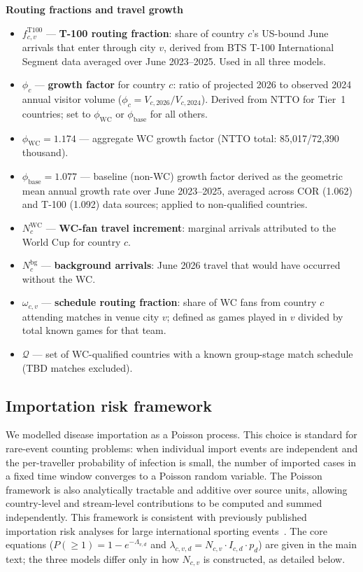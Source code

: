 \documentclass[12pt]{article}
\begin{document}
\vspace{0.5em}
\noindent\textbf{Routing fractions and travel growth}
\begin{itemize}
  \item $f_{c,v}^{\text{T100}}$ --- \textbf{T-100 routing fraction}:
    share of country $c$'s US-bound June arrivals that enter through
    city $v$, derived from BTS T-100 International Segment data
    averaged over June 2023--2025. Used in all three models.
  \item $\phi_c$ --- \textbf{growth factor} for country $c$:
    ratio of projected 2026 to observed 2024 annual visitor volume
    ($\phi_c = V_{c,2026}/V_{c,2024}$). Derived from NTTO for Tier~1
    countries; set to $\phi_{\text{WC}}$ or $\phi_{\text{base}}$ for
    all others.
  \item $\phi_{\text{WC}} = 1.174$ --- aggregate WC growth factor
    (NTTO total: 85,017/72,390 thousand).
  \item $\phi_{\text{base}} = 1.077$ --- baseline (non-WC) growth
    factor derived as the geometric mean annual growth rate over
    June 2023--2025, averaged across COR (1.062) and T-100 (1.092)
    data sources; applied to non-qualified countries.
  \item $N_c^{\text{WC}}$ --- \textbf{WC-fan travel increment}:
    marginal arrivals attributed to the World Cup for country $c$.
  \item $N_c^{\text{bg}}$ --- \textbf{background arrivals}: June
    2026 travel that would have occurred without the WC.
  \item $\omega_{c,v}$ --- \textbf{schedule routing fraction}:
    share of WC fans from country $c$ attending matches in venue
    city $v$; defined as games played in $v$ divided by total known
    games for that team.
  \item $\mathcal{Q}$ --- set of WC-qualified countries with a
    known group-stage match schedule (TBD matches excluded).
\end{itemize}

\subsection*{Importation risk framework}

We modelled disease importation as a Poisson process. This choice
is standard for rare-event counting problems: when individual import
events are independent and the per-traveller probability of infection
is small, the number of imported cases in a fixed time window
converges to a Poisson random variable. The Poisson framework is also
analytically tractable and additive over source units, allowing
country-level and stream-level contributions to be computed and
summed independently. This framework is consistent with previously
published importation risk analyses for large international sporting
events~\cite{Herrera2024}. The core equations
($P(\geq 1) = 1-e^{-\Lambda_{v,d}}$ and
$\lambda_{c,v,d} = N_{c,v} \cdot I_{c,d} \cdot p_d$)
are given in the main text; the three models differ only in how
$N_{c,v}$ is constructed, as detailed below.
\end{document}

